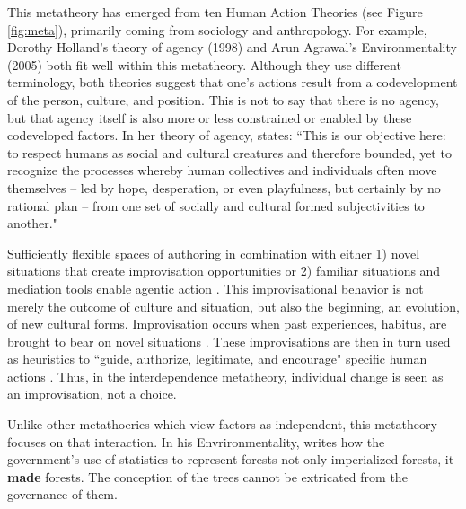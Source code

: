 \documentclass[12 pt]{article}
\begin{document}
		This metatheory has emerged from ten Human Action Theories (see Figure \ref{fig:meta}), primarily coming from sociology and anthropology. For example, Dorothy Holland's theory of agency (1998) and Arun Agrawal's Environmentality (2005) both fit well within this metatheory. Although they use different terminology, both theories suggest that one's actions result from a codevelopment of the person, culture, and position. This is not to say that there is no agency, but that agency itself is also more or less constrained or enabled by these codeveloped factors. In her theory of agency, \textcite{Holland1998} states: ``This is our objective here: to respect humans as social and cultural creatures and therefore bounded, yet to recognize the processes whereby human collectives and individuals often move themselves  -- led by hope, desperation, or even playfulness, but certainly by no rational plan -- from one set of socially and cultural formed subjectivities to another."
		
		Sufficiently flexible spaces of authoring \parencite{Bakhtin1981} in combination with either 1) novel situations that create improvisation opportunities or 2) familiar situations and mediation tools \parencite{Vigotsky1978} enable agentic action \parencite{Holland1998}. This improvisational behavior is not merely the outcome of culture and situation, but also the beginning, an evolution, of new cultural forms. Improvisation occurs when past experiences, habitus, are brought to bear on novel situations \parencite{Bourdieu1977}. These improvisations are then in turn used as heuristics to ``guide, authorize, legitimate, and encourage" specific human actions \parencite[][p. 18]{Holland1998}. Thus, in the interdependence metatheory, individual change is seen as an improvisation, not a choice. 
		
		Unlike other metathoeries which view factors as independent, this metatheory focuses on that interaction. In his Envrironmentality, \textcite{Agrawal2005} writes how the government's use of statistics to represent forests not only imperialized forests, it \textbf{made} forests. The conception of the trees cannot be extricated from the governance of them. 	
		
\end{document}
